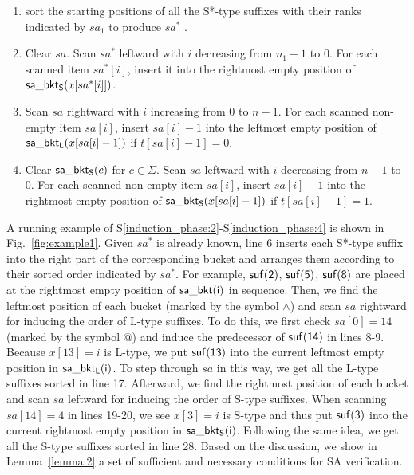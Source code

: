 \documentclass[10pt,journal,compsoc]{IEEEtran}
\begin{document}
\begin{enumerate}[S1'']
	\item sort the starting positions of all the S*-type suffixes with their ranks indicated by $sa_1$ to produce $sa^*$ \label{induction_phase:1}.

	\item Clear $sa$. Scan $sa^*$ leftward with $i$ decreasing from $n_1 - 1$ to $0$. For each scanned item $sa^*[i]$, insert it into the rightmost empty position of ${\sf sa\_bkt_S}(x[sa^*[i]])$. \label{induction_phase:2}
	
	\item Scan $sa$ rightward with $i$ increasing from $0$ to $n - 1$. For each scanned non-empty item $sa[i]$, insert $sa[i] - 1$ into the leftmost empty position of ${\sf sa\_bkt_L}(x[sa[i] - 1])$ if $t[sa[i] - 1] = 0$.\label{induction_phase:3}
	
	\item Clear ${\sf sa\_bkt_S}(c)$ for $c \in \Sigma$. Scan $sa$ leftward with $i$ decreasing from $n - 1$ to $0$. For each scanned non-empty item $sa[i]$, insert $sa[i] - 1$ into the rightmost empty position of ${\sf sa\_bkt_S}(x[sa[i] - 1])$ if $t[sa[i] - 1] = 1$.\label{induction_phase:4}
	
\end{enumerate}

A running example of S\ref{induction_phase:2}-S\ref{induction_phase:4} is shown in Fig.~\ref{fig:example1}. Given $sa^*$ is already known, line 6 inserts each S*-type suffix into the right part of the corresponding bucket and arranges them according to their sorted order indicated by $sa^*$. For example, $\sf suf(2)$, $\sf suf(5)$, $\sf suf(8)$ are placed at the rightmost empty position of $\sf sa\_bkt(i)$ in sequence. Then, we find the leftmost position of each bucket (marked by the symbol $\wedge$) and scan $sa$ rightward for inducing the order of L-type suffixes. To do this, we first check $sa[0] = 14$ (marked by the symbol @) and induce the predecessor of $\sf suf(14)$ in lines 8-9. Because $x[13] = i$ is L-type, we put $\sf suf(13)$ into the current leftmost empty position in $\sf sa\_bkt_L(i)$. To step through $sa$ in this way, we get all the L-type suffixes sorted in line 17. Afterward, we find the rightmost position of each bucket and scan $sa$ leftward for inducing the order of S-type suffixes. When scanning $sa[14] = 4$ in lines 19-20, we see $x[3] = i$ is S-type and thus put $\sf suf(3)$ into the current rightmost empty position in $\sf sa\_bkt_S(i)$. Following the same idea, we get all the S-type suffixes sorted in line 28. Based on the discussion, we show in Lemma~\ref{lemma:2} a set of sufficient and necessary conditions for SA verification.
\end{document}
